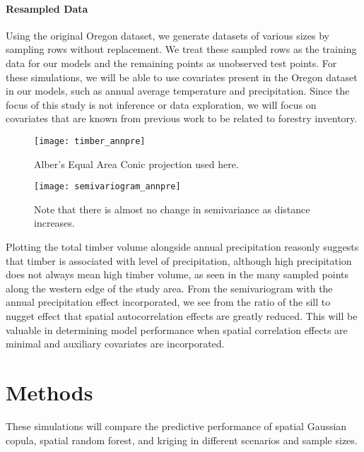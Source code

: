 \documentclass{article}
\begin{document}
\paragraph{Resampled Data} Using the original Oregon dataset, we generate datasets of various sizes by sampling rows without replacement.
We treat these sampled rows as the training data for our models and the remaining points as unobserved test points.
For these simulations, we will be able to use covariates present in the Oregon dataset in our models, such as annual average temperature and precipitation.
Since the focus of this study is not inference or data exploration, we will focus on covariates that are known from previous work\cite{madsen09} to be related to forestry inventory.

\begin{center}
	\begin{figure}[ht]
		\texttt{[image: timber\_annpre]}
		\caption{Alber's Equal Area Conic projection used here.}
	\end{figure}
\end{center}

\begin{wrapfigure}{r}{.40\textwidth}
	\texttt{[image: semivariogram\_annpre]}
	\caption{Note that there is almost no change in semivariance as distance increases.}
\end{wrapfigure}

Plotting the total timber volume alongside annual precipitation reasonly suggests that timber is associated with level of precipitation, although high precipitation does not always mean high timber volume, as seen in the many sampled points along the western edge of the study area.
From the semivariogram with the annual precipitation effect incorporated, we see from the ratio of the sill to nugget effect that spatial autocorrelation effects are greatly reduced.
This will be valuable in determining model performance when spatial correlation effects are minimal and auxiliary covariates are incorporated.


\section{Methods}

These simulations will compare the predictive performance of spatial Gaussian copula, spatial random forest, and kriging in different scenarios and sample sizes.
\end{document}
